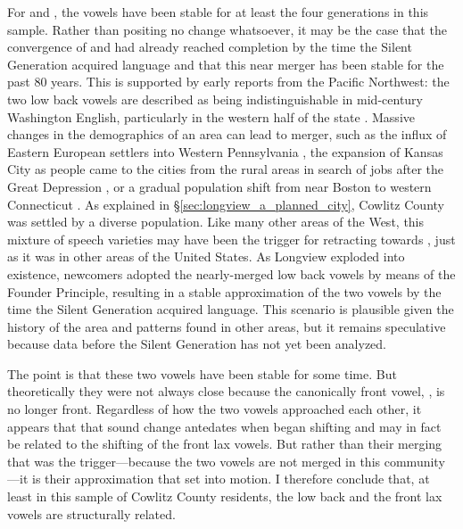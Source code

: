 For \lot and \thought, the vowels have been stable for at least the four generations in this sample. Rather than positing no change whatsoever, it may be the case that the convergence of \lot and \thought had already reached completion by the time the Silent Generation acquired language and that this near merger has been stable for the past 80 years. This is supported by early reports from the Pacific Northwest: the two low back vowels are described as being indistinguishable in mid-century Washington English, particularly in the western half of the state \citep{reed_1952}. Massive changes in the demographics of an area can lead to merger, such as the influx of Eastern European settlers into Western Pennsylvania \citep{herold_1990_diss}, the expansion of Kansas City as people came to the cities from the rural areas in search of jobs after the Great Depression \citep{strelluf_2019}, or a gradual population shift from near Boston to western Connecticut \citep{johnson_2010_pads}. As explained in \S\ref{sec:longview_a_planned_city}, Cowlitz County was settled by a diverse population. Like many other areas of the West, this mixture of speech varieties may have been the trigger for \lot retracting towards \thought, just as it was in other areas of the United States. As Longview exploded into existence, newcomers adopted the nearly-merged low back vowels by means of the Founder Principle, resulting in a stable approximation of the two vowels by the time the Silent Generation acquired language. This scenario is plausible given the history of the area and patterns found in other areas, but it remains speculative because data before the Silent Generation has not yet been analyzed.

The point is that these two vowels have been stable for some time. But theoretically they were not always close because the canonically front vowel, \lot, is no longer front. Regardless of how the two vowels approached each other, it appears that that sound change antedates when \trap began shifting and may in fact be related to the shifting of the front lax vowels. But rather than their merging that was the trigger---because the two vowels are not merged in this community---it is their approximation that set \bat into motion. I therefore conclude that, at least in this sample of Cowlitz County residents, the low back and the front lax vowels are structurally related.

